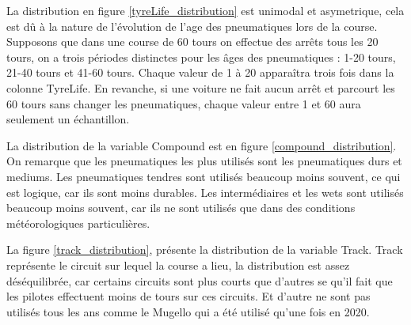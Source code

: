 La distribution en figure \ref{tyreLife_distribution} est unimodal et asymetrique, cela est dû à la nature de l'évolution de l'age des pneumatiques lors de la course.
Supposons que dans une course de 60 tours on effectue des arrêts tous les 20 tours, on a trois périodes distinctes pour les âges des pneumatiques : 1-20 tours, 21-40 tours et 41-60 tours.
Chaque valeur de 1 à 20 apparaîtra trois fois dans la colonne TyreLife.
En revanche, si une voiture ne fait aucun arrêt et parcourt les 60 tours sans changer les pneumatiques, chaque valeur entre 1 et 60 aura seulement un échantillon.


La distribution de la variable Compound est en figure \ref{compound_distribution}.
On remarque que les pneumatiques les plus utilisés sont les pneumatiques durs et mediums. Les pneumatiques tendres sont utilisés beaucoup moins souvent, ce qui est logique, car ils sont moins durables.
Les intermédiaires et les wets sont utilisés beaucoup moins souvent, car ils ne sont utilisés que dans des conditions météorologiques particulières.


La figure \ref{track_distribution}, présente la distribution de la variable Track.
Track représente le circuit sur lequel la course a lieu, la distribution est assez déséquilibrée, car certains circuits sont plus courts que d'autres se qu'il fait que les pilotes effectuent moins de tours sur ces circuits.
Et d'autre ne sont pas utilisés tous les ans comme le Mugello qui a été utilisé qu'une fois en 2020.


